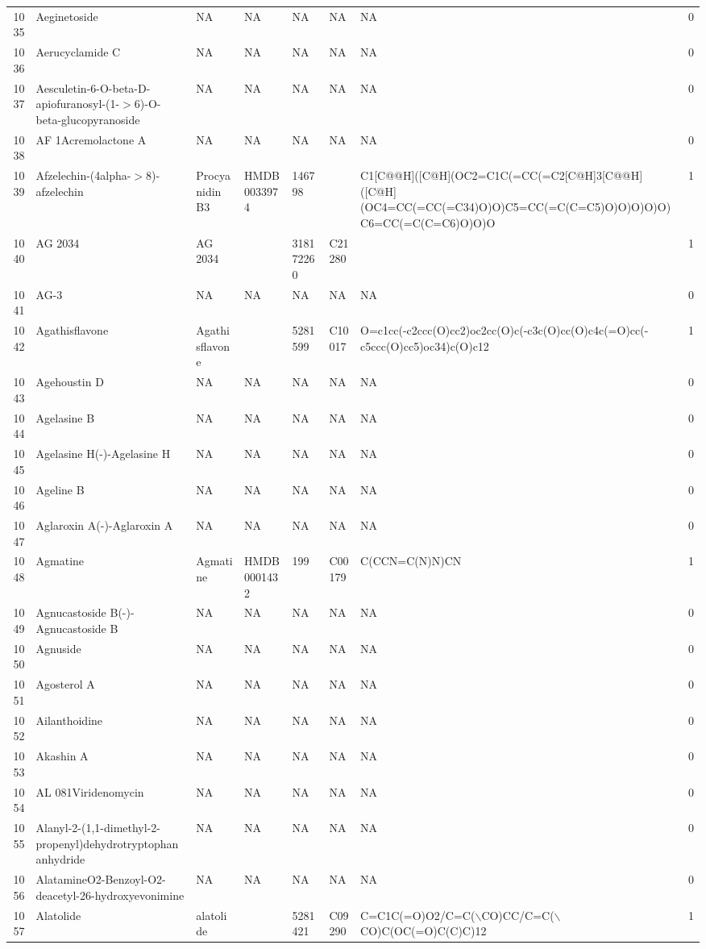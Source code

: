\documentclass[a4paper]{article}
\begin{document}
\begin{longtable}{rlllllll}
  1035 & Aeginetoside & NA & NA & NA & NA & NA & 0 \\ 
  1036 & Aerucyclamide C & NA & NA & NA & NA & NA & 0 \\ 
  1037 & Aesculetin-6-O-beta-D-apiofuranosyl-(1-$>$6)-O-beta-glucopyranoside & NA & NA & NA & NA & NA & 0 \\ 
  1038 & AF 1Acremolactone A & NA & NA & NA & NA & NA & 0 \\ 
  1039 & Afzelechin-(4alpha-$>$8)-afzelechin & Procyanidin B3 & HMDB0033974 & 146798 &  & C1[C@@H]([C@H](OC2=C1C(=CC(=C2[C@H]3[C@@H]([C@H](OC4=CC(=CC(=C34)O)O)C5=CC(=C(C=C5)O)O)O)O)O)C6=CC(=C(C=C6)O)O)O & 1 \\ 
  1040 & AG 2034 & AG 2034 &  & 318172260 & C21280 &  & 1 \\ 
  1041 & AG-3 & NA & NA & NA & NA & NA & 0 \\ 
  1042 & Agathisflavone & Agathisflavone &  & 5281599 & C10017 & O=c1cc(-c2ccc(O)cc2)oc2cc(O)c(-c3c(O)cc(O)c4c(=O)cc(-c5ccc(O)cc5)oc34)c(O)c12 & 1 \\ 
  1043 & Agehoustin D & NA & NA & NA & NA & NA & 0 \\ 
  1044 & Agelasine B & NA & NA & NA & NA & NA & 0 \\ 
  1045 & Agelasine H(-)-Agelasine H & NA & NA & NA & NA & NA & 0 \\ 
  1046 & Ageline B & NA & NA & NA & NA & NA & 0 \\ 
  1047 & Aglaroxin A(-)-Aglaroxin A & NA & NA & NA & NA & NA & 0 \\ 
  1048 & Agmatine & Agmatine & HMDB0001432 & 199 & C00179 & C(CCN=C(N)N)CN & 1 \\ 
  1049 & Agnucastoside B(-)-Agnucastoside B & NA & NA & NA & NA & NA & 0 \\ 
  1050 & Agnuside & NA & NA & NA & NA & NA & 0 \\ 
  1051 & Agosterol A & NA & NA & NA & NA & NA & 0 \\ 
  1052 & Ailanthoidine & NA & NA & NA & NA & NA & 0 \\ 
  1053 & Akashin A & NA & NA & NA & NA & NA & 0 \\ 
  1054 & AL 081Viridenomycin & NA & NA & NA & NA & NA & 0 \\ 
  1055 & Alanyl-2-(1,1-dimethyl-2-propenyl)dehydrotryptophan anhydride & NA & NA & NA & NA & NA & 0 \\ 
  1056 & AlatamineO2-Benzoyl-O2-deacetyl-26-hydroxyevonimine & NA & NA & NA & NA & NA & 0 \\ 
  1057 & Alatolide & alatolide &  & 5281421 & C09290 & C=C1C(=O)O2/C=C($\backslash$CO)CC/C=C($\backslash$CO)C(OC(=O)C(C)C)12 & 1 \\ 

\end{longtable}
\end{document}
